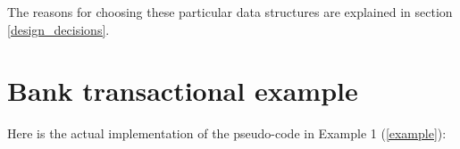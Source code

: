 \documentclass[12pt,twoside,notitlepage]{report}
\begin{document}
{The reasons for choosing these particular data structures are explained in section \ref{design_decisions}.  

\section{Bank transactional example}

Here is the actual implementation of the pseudo-code in Example 1 (\ref{example}):
\label{rev_in_ocaml}

}
\end{document}
